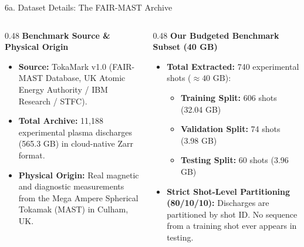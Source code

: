 \documentclass[aspectratio=169, 10pt]{beamer}
\begin{document}
\begin{frame}{6a. Dataset Details: The FAIR-MAST Archive}
  \begin{columns}[T]
    \begin{column}{0.48\textwidth}
      \textbf{\color{NavyBlue} Benchmark Source \& Physical Origin}
      \begin{itemize}
        \item \textbf{Source:} TokaMark v1.0 (FAIR-MAST Database, UK Atomic Energy Authority / IBM Research / STFC).
        \item \textbf{Total Archive:} 11,188 experimental plasma discharges (565.3 GB) in cloud-native Zarr format.
        \item \textbf{Physical Origin:} Real magnetic and diagnostic measurements from the Mega Ampere Spherical Tokamak (MAST) in Culham, UK.
      \end{itemize}
    \end{column}

    \begin{column}{0.48\textwidth}
      \textbf{\color{NavyBlue} Our Budgeted Benchmark Subset (40 GB)}
      \begin{itemize}
        \item \textbf{Total Extracted:} 740 experimental shots ($\approx 40\text{ GB}$):
          \begin{itemize}
            \item \textbf{Training Split:} 606 shots (32.04 GB)
            \item \textbf{Validation Split:} 74 shots (3.98 GB)
            \item \textbf{Testing Split:} 60 shots (3.96 GB)
          \end{itemize}
        \item \textbf{Strict Shot-Level Partitioning (80/10/10):}
          Discharges are partitioned by shot ID. No sequence from a training shot ever appears in testing.
      \end{itemize}
    \end{column}
  \end{columns}
\end{frame}
\end{document}
